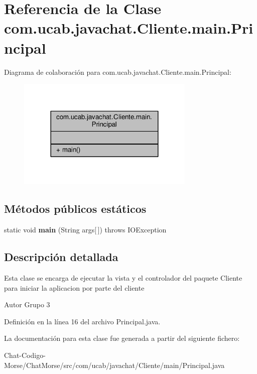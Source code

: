 \hypertarget{classcom_1_1ucab_1_1javachat_1_1_cliente_1_1main_1_1_principal}{\section{Referencia de la Clase com.\-ucab.\-javachat.\-Cliente.\-main.\-Principal}
\label{classcom_1_1ucab_1_1javachat_1_1_cliente_1_1main_1_1_principal}
}


Diagrama de colaboración para com.\-ucab.\-javachat.\-Cliente.\-main.\-Principal\-:
\nopagebreak
\begin{figure}[H]
\begin{center}
\leavevmode
\includegraphics[width=240pt]{d3/d97/classcom_1_1ucab_1_1javachat_1_1_cliente_1_1main_1_1_principal__coll__graph}
\end{center}
\end{figure}
\subsection*{Métodos públicos estáticos}
\begin{DoxyCompactItemize}
\item 
\hypertarget{classcom_1_1ucab_1_1javachat_1_1_cliente_1_1main_1_1_principal_a0560b184945ff743d2f7a9225b2a8e12}{static void {\bfseries main} (String args\mbox{[}$\,$\mbox{]})  throws I\-O\-Exception }\label{classcom_1_1ucab_1_1javachat_1_1_cliente_1_1main_1_1_principal_a0560b184945ff743d2f7a9225b2a8e12}

\end{DoxyCompactItemize}


\subsection{Descripción detallada}
Esta clase se encarga de ejecutar la vista y el controlador del paquete Cliente para iniciar la aplicacion por parte del cliente \begin{DoxyAuthor}{Autor}
Grupo 3 
\end{DoxyAuthor}


Definición en la línea 16 del archivo Principal.\-java.



La documentación para esta clase fue generada a partir del siguiente fichero\-:\begin{DoxyCompactItemize}
\item 
Chat-\/\-Codigo-\/\-Morse/\-Chat\-Morse/src/com/ucab/javachat/\-Cliente/main/Principal.\-java\end{DoxyCompactItemize}
